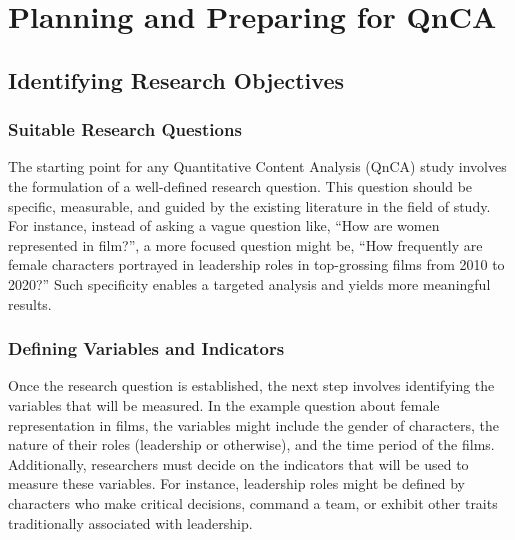 \documentclass[
  b5paper]{book}
\begin{document}
\hypertarget{planning-and-preparing-for-qnca}{%
\section{Planning and Preparing for QnCA}\label{planning-and-preparing-for-qnca}}

\hypertarget{identifying-research-objectives}{%
\subsection*{Identifying Research Objectives}\label{identifying-research-objectives}}

\hypertarget{suitable-research-questions}{%
\subsubsection*{Suitable Research Questions}\label{suitable-research-questions}}

The starting point for any Quantitative Content Analysis (QnCA) study involves the formulation of a well-defined research question. This question should be specific, measurable, and guided by the existing literature in the field of study. For instance, instead of asking a vague question like, ``How are women represented in film?'', a more focused question might be, ``How frequently are female characters portrayed in leadership roles in top-grossing films from 2010 to 2020?'' Such specificity enables a targeted analysis and yields more meaningful results.

\hypertarget{defining-variables-and-indicators}{%
\subsubsection*{Defining Variables and Indicators}\label{defining-variables-and-indicators}}

Once the research question is established, the next step involves identifying the variables that will be measured. In the example question about female representation in films, the variables might include the gender of characters, the nature of their roles (leadership or otherwise), and the time period of the films. Additionally, researchers must decide on the indicators that will be used to measure these variables. For instance, leadership roles might be defined by characters who make critical decisions, command a team, or exhibit other traits traditionally associated with leadership.
\end{document}
